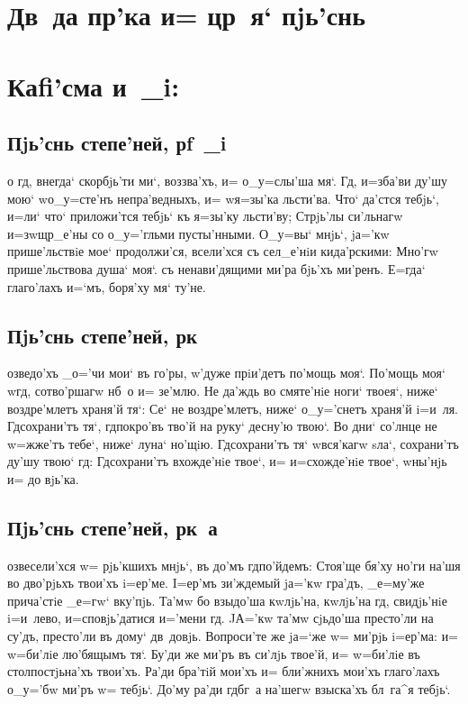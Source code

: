 \documentclass[12pt,twoside,a6paper,xdvi,civil=antiqua]{hipbook}
\begin{document}
\csendpict

\clearpage
\hdrcrosspage

\section{{\Large Дв~да пр'ка и= цр~я` пjь'снь}}
\baselineskip
\section[Каfi'сма и~_i]{Каfi'сма и~_i:}

\subsection{Пjь'снь степе'ней, рf~_i}

о гд, внегда` скорбjь'ти ми`, воззва'хъ, и= о_у=слы'ша мя`. Гд,
и=зба'ви ду'шу мою` w\т о_у=сте'нъ непра'ведныхъ, и= w\т я=зы'ка
льсти'ва. Что` да'стся тебjь`, и=ли` что` приложи'тся тебjь` къ я=зы'ку
льсти'ву; Стрjь'лы си'льнагw и=зw\-щ\-р_е'\-ны со о_у='гльми пусты'нными. О_у=вы`
мнjь`, jа='кw прише'льствiе мое` продолжи'ся, все\-ли'х\-ся съ сел_е'нiи
кида'рскими: Мно'гw при\-ше'ль\-ст\-во\-ва душа` моя`. съ ненави'дящими ми'ра бjь'хъ
ми'ренъ. Е=гда` глаго'лахъ и=`мъ, боря'ху мя` ту'не.

\delimpict

\subsection{Пjь'снь степе'ней, рк~}

озведо'хъ _о='чи мои` въ го'ры, w'дуже прiи'детъ по'мощь
моя`. По'мощь моя` w\т гд, сотво'ршагw нб~о и= зе'млю. Не да'ждь во
смя\-те'\-нiе ноги` твоея`, ниже` воздре'млетъ храня'й тя`: Се` не воздре'млетъ,
ниже` о_у='снетъ хра\-ня'й i=и~ля. Гд сохрани'тъ тя`, гд покро'въ тво'й на
руку` десну'ю твою`. Во дни` со'лнце не w=жже'тъ тебе`, ниже` луна`
но'щiю. Гд со\-хра\-ни'тъ тя` w\т вся'кагw sла`, сохрани'тъ ду'шу твою` гд:
Гд сохрани'тъ вхожде'нiе твое`, и= и=схожде'нiе твое`, w\т ны'нjь и= до
вjь'ка.

\delimpict

\subsection{Пjь'снь степе'ней, рк~а}

озвесели'хся w= рjь'кшихъ мнjь`, въ до'мъ гд по'йдемъ: Стоя'ще
бя'ху но'ги на'шя во дво'рjьхъ твои'хъ i=ер'ме. I=ер'мъ зи'ждемый
jа='кw гра'дъ, _е=му'же прича'стiе _е=гw` вку'пjь. Та'\-мw бо взыдо'ша кwлjь'на,
кwлjь'на гд, свидjь'нiе i=и~лево, и=сповjь'датися и='мени гд. JА='кw
та'мw сjьдо'ша престо'ли на су'дъ, престо'ли въ дому` дв~довjь. Вопроси'те же
jа=`же w= ми'рjь i=ер'ма: и= w=би'лiе лю'бящымъ тя`. Бу'ди же ми'ръ въ
си'лjь твое'й, и= w=би'лiе въ столпостjьна'хъ твои'хъ. Ра'ди бра'тiй мои'хъ и=
бли'жнихъ мои'хъ глаго'лахъ о_у='бw ми'ръ w= тебjь`. До'му ра'ди гд бг~а
на'шегw взыска'хъ бл~га^я тебjь`.
\end{document}
